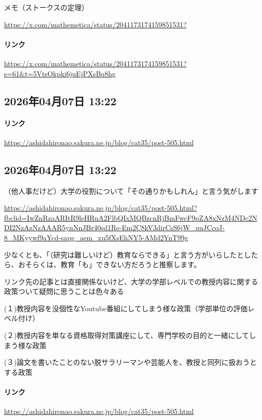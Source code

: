 メモ（ストークスの定理）

\url{https://x.com/mathemetica/status/2041173174159851531?}

\paragraph{リンク}
\url{https://x.com/mathemetica/status/2041173174159851531?s=61&t=5VtsOkpki6juEjPXsBq8hg}

\subsection*{2026年04月07日 13:22}

\paragraph{リンク}
\url{https://ashidahironao.sakura.ne.jp/blog/cat35/post-505.html}

\subsection*{2026年04月07日 13:22}

（他人事だけど）大学の役割について「その通りかもしれん」と言う気がします

\url{https://ashidahironao.sakura.ne.jp/blog/cat35/post-505.html?fbclid=IwZnRzaARItR9leHRuA2FlbQIxMQBzcnRjBmFwcF9pZA8xNzM4NDc2NDI2NzAzNzAAAR5ynNnJBr40sd1Re-Em2C8kV3dirCsS6jW_uuJCcoJ-8_MKyywf9aYcd-sapg_aem_xu5fXsEhNY5-AMd2YnT99g}

少なくとも、「（研究は難しいけど）教育ならできる」と言う方がいらしたとしたら、おそらくは、教育「も」できない方だろうと推察します。

リンク先の記事とは直接関係ないけど、大学の学部レベルでの教授内容に関する政策ついて疑問に思うことは色々ある

(１)教授内容を没個性なYoutube番組にしてしまう様な政策（学部単位の評価レベル付け）

(２)教授内容を単なる資格取得対策講座にして、専門学校の目的と一緒にしてしまう様な政策

(３)論文を書いたことのない脱サラリーマンや芸能人を、教授と同列に扱おうとする政策

\paragraph{リンク}
\url{https://ashidahironao.sakura.ne.jp/blog/cat35/post-505.html}

